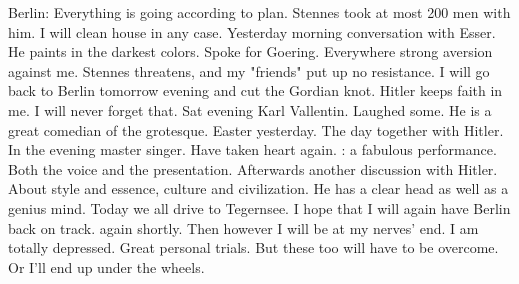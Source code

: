Berlin: Everything is going according to plan. Stennes took at most 200 men with him. I will clean house in any case. Yesterday morning conversation with Esser. He paints in the darkest colors. Spoke for Goering. Everywhere strong aversion against me. Stennes threatens, and my "friends" put up no resistance. I will go back to Berlin tomorrow evening and cut the Gordian knot. Hitler keeps faith in me. I will never forget that. Sat evening Karl Vallentin. Laughed some. He is a great comedian of the grotesque. Easter yesterday. The day together with Hitler. In the evening master singer. Have taken heart again. : a fabulous performance. Both the voice and the presentation. Afterwards another discussion with Hitler. About style and essence, culture and civilization. He has a clear head as well as a genius mind. Today we all drive to Tegernsee. I hope that I will again have Berlin back on track. again shortly. Then however I will be at my nerves' end. I am totally depressed. Great personal trials. But these too will have to be overcome. Or I'll end up under the wheels.

